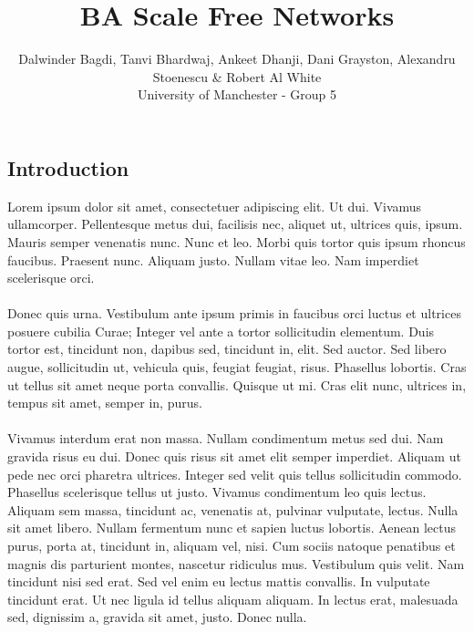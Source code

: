 \documentclass[a0,final]{a0poster}
\title{BA Scale Free Networks}
\author{Dalwinder Bagdi, Tanvi Bhardwaj, Ankeet Dhanji, Dani Grayston, Alexandru Stoenescu \& Robert Al White\\
University of Manchester - Group 5}
\begin{document}
\hspace{-3cm}								%
\colorbox{boxcol}{							%
\begin{minipage}{1189mm}					%
\maketitle
\end{minipage}}
\vspace{1cm}

\begin{multicols}{3}							%
\raggedcolumns							%

\section*{Introduction}
Lorem ipsum dolor sit amet, consectetuer adipiscing elit. Ut dui. Vivamus ullamcorper. Pellentesque metus dui, facilisis nec, aliquet ut, ultrices quis, ipsum. Mauris semper venenatis nunc. Nunc et leo. Morbi quis tortor quis ipsum rhoncus faucibus. Praesent nunc. Aliquam justo. Nullam vitae leo. Nam imperdiet scelerisque orci.\\
\\
Donec quis urna. Vestibulum ante ipsum primis in faucibus orci luctus et ultrices posuere cubilia Curae; Integer vel ante a tortor sollicitudin elementum. Duis tortor est, tincidunt non, dapibus sed, tincidunt in, elit. Sed auctor. Sed libero augue, sollicitudin ut, vehicula quis, feugiat feugiat, risus. Phasellus lobortis. Cras ut tellus sit amet neque porta convallis. Quisque ut mi. Cras elit nunc, ultrices in, tempus sit amet, semper in, purus.\\
\\
Vivamus interdum erat non massa. Nullam condimentum metus sed dui. Nam gravida risus eu dui. Donec quis risus sit amet elit semper imperdiet. Aliquam ut pede nec orci pharetra ultrices. Integer sed velit quis tellus sollicitudin commodo. Phasellus scelerisque tellus ut justo. Vivamus condimentum leo quis lectus. Aliquam sem massa, tincidunt ac, venenatis at, pulvinar vulputate, lectus. Nulla sit amet libero. Nullam fermentum nunc et sapien luctus lobortis. Aenean lectus purus, porta at, tincidunt in, aliquam vel, nisi. Cum sociis natoque penatibus et magnis dis parturient montes, nascetur ridiculus mus. Vestibulum quis velit. Nam tincidunt nisi sed erat. Sed vel enim eu lectus mattis convallis. In vulputate tincidunt erat. Ut nec ligula id tellus aliquam aliquam. In lectus erat, malesuada sed, dignissim a, gravida sit amet, justo. Donec nulla.



\end{multicols}
\end{document}
